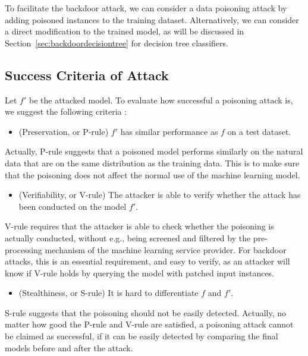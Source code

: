 To facilitate the backdoor attack, we can consider  
a data poisoning attack by adding poisoned instances to the training dataset. Alternatively, we can consider a direct modification to the trained model, as will be discussed in Section~\ref{sec:backdoordecisiontree} for decision tree classifiers. 

\subsection*{Success Criteria of Attack} 

Let $f'$ be the attacked model. To evaluate how successful a poisoning attack is, we suggest the following criteria \cite{huang2020embedding}: 

\begin{itemize}
    \item (Preservation, or P-rule)  $f'$ has similar performance as $f$ on a test dataset. 
\end{itemize}
Actually, P-rule suggests that a poisoned model performs similarly on the natural data that are on the same distribution as the training data. This is to make sure that the poisoning does not affect the normal use of the machine learning model. 

\begin{itemize}
    \item (Verifiability, or V-rule) The attacker is able to verify whether the attack has been conducted on the model $f'$. 
\end{itemize}
V-rule requires that the attacker is able to check whether the poisoning is actually conducted, without e.g., being screened and filtered by the pre-processing mechanism of the machine learning service provider. For backdoor attacks, this is an essential requirement, and easy to verify, as an attacker will know if V-rule holds by querying the model with patched input instances. 

\begin{itemize}
    \item (Stealthiness, or S-rule) It is hard to differentiate $f$ and $f'$. 
\end{itemize}
S-rule suggests that the poisoning should not be easily detected. Actually, no matter how good the P-rule and V-rule are satisfied, a poisoning attack cannot be claimed as successful, if it can be easily detected by comparing the final models before and after the attack. 

